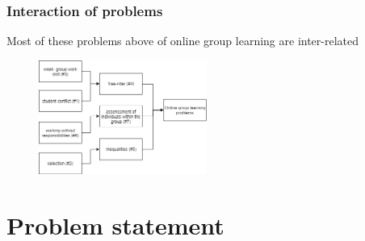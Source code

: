 \documentclass{beamer}
\begin{document}
\begin{frame}
\frametitle{ Interaction of problems }
Most of these problems above of online group learning are inter-related

\begin{figure}
\includegraphics[width=55mm]{p21.png}
\end{figure}






\end{frame}
\section{Problem statement} %
\end{document}
